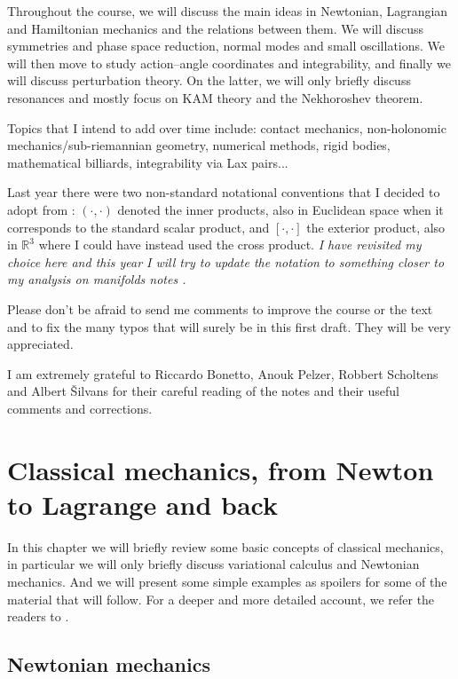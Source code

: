 \documentclass[english,fontsize=11pt,paper=a5,oneside]{scrbook}
\newcommand{\R}{\mathbb{R}}
\theoremstyle{definition}
\begin{document}
Throughout the course, we will discuss the main ideas in Newtonian, Lagrangian and Hamiltonian mechanics and the relations between them.
We will discuss symmetries and phase space reduction, normal modes and small oscillations.
We will then move to study action--angle coordinates and integrability, and finally we will discuss perturbation theory.
On the latter, we will only briefly discuss resonances and mostly focus on KAM theory and the Nekhoroshev theorem.

Topics that I intend to add over time include: contact mechanics, non-holonomic mechanics/sub-riemannian geometry, numerical methods, rigid bodies, mathematical billiards, integrability via Lax pairs...

Last year there were two non-standard notational conventions that I decided to adopt from \cite{book:arnold}: $(\cdot,\cdot)$ denoted the inner products, also in Euclidean space when it corresponds to the standard scalar product, and $[\cdot,\cdot]$ the exterior product, also in $\R^3$ where I could have instead used the cross product. \emph{I have revisited my choice here and this year I will try to update the notation to something closer to my analysis on manifolds notes \cite{lectures:aom:seri}.}

Please don't be afraid to send me comments to improve the course or the text and to fix the many typos that will surely be in this first draft. They will be very appreciated.

I am extremely grateful to Riccardo Bonetto, Anouk Pelzer, Robbert Scholtens and Albert \v{S}ilvans for their careful reading of the notes and their useful comments and corrections.

\chapter{Classical mechanics, from Newton to Lagrange and back}

In this chapter we will briefly review some basic concepts of classical mechanics, in particular we will only briefly discuss variational calculus and Newtonian mechanics.
And we will present some simple examples as spoilers for some of the material that will follow.
For a deeper and more detailed account, we refer the readers to \cite{book:arnold,book:knauf}.

\section{Newtonian mechanics}
\end{document}
